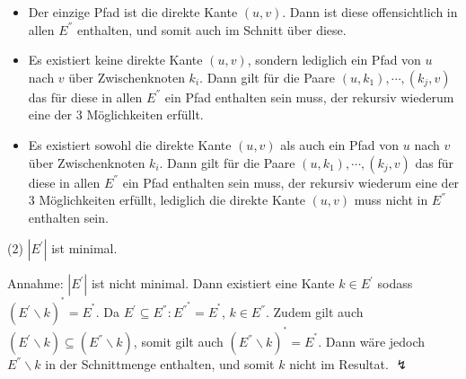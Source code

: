 \begin{itemize}

	\item Der einzige Pfad ist die direkte Kante $(u,v)$. Dann ist diese offensichtlich in allen $E^{''}$ enthalten, und somit auch im Schnitt über diese.
	\item Es existiert keine direkte Kante $(u,v)$, sondern lediglich ein Pfad von $u$ nach $v$ über Zwischenknoten $k_i$. Dann gilt für die Paare $(u, k_1), \cdots, (k_j, v)$ das für diese in allen $E^{''}$ ein Pfad enthalten sein muss, der rekursiv wiederum eine der 3 Möglichkeiten erfüllt.
	\item Es existiert sowohl die direkte Kante $(u,v)$ als auch ein Pfad von $u$ nach $v$ über Zwischenknoten $k_i$. Dann gilt für die Paare $(u, k_1), \cdots, (k_j, v)$ das für diese in allen $E^{''}$ ein Pfad enthalten sein muss, der rekursiv wiederum eine der 3 Möglichkeiten erfüllt, lediglich die direkte Kante $(u,v)$ muss nicht in $E^{''}$ enthalten sein.
\end{itemize}

(2) $|E^{'}|$ ist minimal.

Annahme: $|E^{'}|$ ist nicht minimal. Dann existiert eine Kante $k \in E^{'}$ sodass $(E^{'}\backslash k)^{^*} = E^{^*}$. Da $E^{'} \subseteq E^{''} : E^{''^*} = E^{^*}$, $k \in E^{''}$. Zudem gilt auch $(E^{'}\backslash k) \subseteq (E^{''}\backslash k)$, somit gilt auch $(E^{''}\backslash k)^{^*} = E^{^*}$. Dann wäre jedoch $E^{''}\backslash k$ in der Schnittmenge enthalten, und somit $k$ nicht im Resultat. $\lightning$



